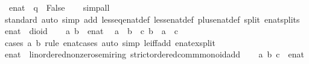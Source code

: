 \begin{isabellebody}
\ \ {\isachardoublequoteopen}{\isacharparenleft}{\isasyminfinity}{\isacharcolon}{\isacharcolon}enat{\isacharparenright}\ {\isacharless}\ q\ {\isasymlongleftrightarrow}\ False{\isachardoublequoteclose}\isanewline
%
\isadelimproof
\ \ %
\endisadelimproof
%
\isatagproof
{}\isamarkupfalse%
\ simp{\isacharunderscore}all%
\endisatagproof
{\isafoldproof}%
%
\isadelimproof
\isanewline
%
\endisadelimproof
\isanewline
{}\isamarkupfalse%
\isanewline
%
\isadelimproof
\ \ %
\endisadelimproof
%
\isatagproof
{}\isamarkupfalse%
\ standard\ {\isacharparenleft}auto\ simp\ add{\isacharcolon}\ less{\isacharunderscore}eq{\isacharunderscore}enat{\isacharunderscore}def\ less{\isacharunderscore}enat{\isacharunderscore}def\ plus{\isacharunderscore}enat{\isacharunderscore}def\ split{\isacharcolon}\ enat{\isachardot}splits{\isacharparenright}%
\endisatagproof
{\isafoldproof}%
%
\isadelimproof
\isanewline
%
\endisadelimproof
\isanewline
{}\isamarkupfalse%
\isanewline
\isanewline
{}\isamarkupfalse%
\ enat\ {\isacharcolon}{\isacharcolon}\ dioid\isanewline
%
\isadelimproof
%
\endisadelimproof
%
\isatagproof
{}\isamarkupfalse%
\isanewline
\ \ \isamarkupfalse%
\ a\ b\ {\isacharcolon}{\isacharcolon}\ enat\ \isamarkupfalse%
\ {\isachardoublequoteopen}{\isacharparenleft}a\ {\isasymle}\ b{\isacharparenright}\ {\isacharequal}\ {\isacharparenleft}{\isasymexists}c{\isachardot}\ b\ {\isacharequal}\ a\ {\isacharplus}\ c{\isacharparenright}{\isachardoublequoteclose}\isanewline
\ \ \ \ \isamarkupfalse%
\ {\isacharparenleft}cases\ a\ b\ rule{\isacharcolon}\ enat{}{\isacharunderscore}cases{\isacharparenright}\ {\isacharparenleft}auto\ simp{\isacharcolon}\ le{\isacharunderscore}iff{\isacharunderscore}add\ enat{\isacharunderscore}ex{\isacharunderscore}split{\isacharparenright}\isanewline
{}\isamarkupfalse%
%
\endisatagproof
{\isafoldproof}%
%
\isadelimproof
\isanewline
%
\endisadelimproof
\isanewline
{}\isamarkupfalse%
\ enat\ {\isacharcolon}{\isacharcolon}\ {\isachardoublequoteopen}{\isacharbraceleft}linordered{\isacharunderscore}nonzero{\isacharunderscore}semiring{\isacharcomma}\ strict{\isacharunderscore}ordered{\isacharunderscore}comm{\isacharunderscore}monoid{\isacharunderscore}add{\isacharbraceright}{\isachardoublequoteclose}\isanewline
%
\isadelimproof
%
\endisadelimproof
%
\isatagproof
{}\isamarkupfalse%
\isanewline
\ \ \isamarkupfalse%
\ a\ b\ c\ {\isacharcolon}{\isacharcolon}\ enat\isanewline

\end{isabellebody}
